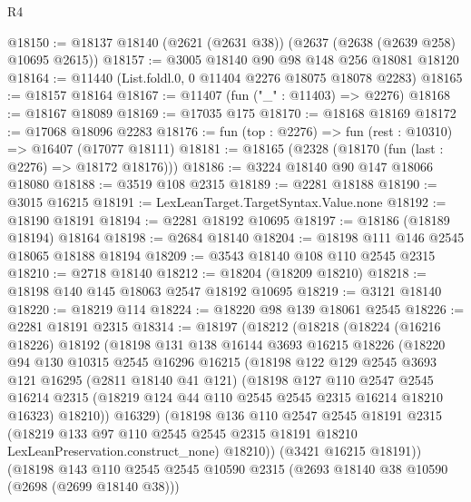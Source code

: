 \begin{lexlean}{R4}
\begin{coremodule}
@18150 := @18137 @18140 (@2621 (@2631 @38)) (@2637 (@2638 (@2639 @258) @10695 @2615))
@18157 := @3005 @18140 @90 @98 @148 @256 @18081 @18120
@18164 := @11440 (List.foldl.{0, 0} @11404 @2276 @18075 @18078 @2283)
@18165 := @18157 @18164
@18167 := @11407 (fun ("_" : @11403) => @2276)
@18168 := @18167 @18089
@18169 := @17035 @175
@18170 := @18168 @18169
@18172 := @17068 @18096 @2283
@18176 := fun (top : @2276) => fun (rest : @10310) => @16407 (@17077 @18111)
@18181 := @18165 (@2328 (@18170 (fun (last : @2276) => @18172 @18176)))
@18186 := @3224 @18140 @90 @147 @18066 @18080
@18188 := @3519 @108 @2315
@18189 := @2281 @18188
@18190 := @3015 @16215
@18191 := LexLeanTarget.TargetSyntax.Value.none
@18192 := @18190 @18191
@18194 := @2281 @18192 @10695
@18197 := @18186 (@18189 @18194) @18164
@18198 := @2684 @18140
@18204 := @18198 @111 @146 @2545 @18065 @18188 @18194
@18209 := @3543 @18140 @108 @110 @2545 @2315
@18210 := @2718 @18140
@18212 := @18204 (@18209 @18210)
@18218 := @18198 @140 @145 @18063 @2547 @18192 @10695
@18219 := @3121 @18140
@18220 := @18219 @114
@18224 := @18220 @98 @139 @18061 @2545
@18226 := @2281 @18191 @2315
@18314 := @18197
    (@18212
      (@18218
        (@18224
          (@16216 @18226)
          @18192
          (@18198
            @131
            @138
            @16144
            @3693
            @16215
            @18226
            (@18220
              @94
              @130
              @10315
              @2545
              @16296
              @16215
              (@18198
                @122
                @129
                @2545
                @3693
                @121
                @16295
                (@2811 @18140 @41 @121)
                (@18198
                  @127
                  @110
                  @2547
                  @2545
                  @16214
                  @2315
                  (@18219 @124 @44 @110 @2545 @2545 @2315 @16214 @18210 @16323)
                  @18210))
              @16329)
            (@18198
              @136
              @110
              @2547
              @2545
              @18191
              @2315
              (@18219
                @133
                @97
                @110
                @2545
                @2545
                @2315
                @18191
                @18210
                LexLeanPreservation.construct_none)
              @18210))
          (@3421 @16215 @18191))
        (@18198
          @143
          @110
          @2545
          @2545
          @10590
          @2315
          (@2693 @18140 @38 @10590 (@2698 (@2699 @18140 @38)))

\end{coremodule}
\end{lexlean}

